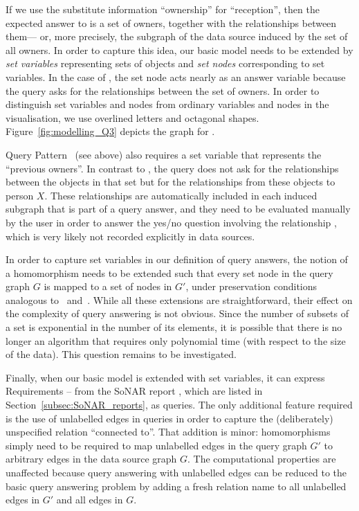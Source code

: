 If we use the substitute information \enquote{ownership} for \enquote{reception},
then the expected answer to  is a set of owners,
together with the relationships between them---%
or, more precisely, the subgraph of the data source induced by the set of all owners.
In order to capture this idea,
our basic model needs to be extended by \emph{set variables} representing sets of objects
and \emph{set nodes} corresponding to set variables.
In the case of , the set node acts nearly as an answer variable
because the query asks for the relationships between the set of owners.
In order to distinguish set variables and nodes from ordinary variables and nodes in the visualisation,
we use overlined letters and octagonal shapes.
Figure~\ref{fig:modelling_Q3} depicts the graph for .

Query Pattern~ (see above) also requires a set variable
that represents the \enquote{previous owners}. In contrast to ,
the query does not ask for the relationships between the objects in that set
but for the relationships from these objects to person $X$.
These relationships are automatically included in each induced subgraph that is part of a query answer,
and they need to be evaluated manually by the user
in order to answer the yes/no question involving the relationship ,
which is very likely not recorded explicitly in data sources.

In order to capture set variables in our definition of query answers,
the notion of a homomorphism needs to be extended such that
every set node in the query graph $G$ is mapped to a set of nodes in $G'$,
under preservation conditions analogous to~ and~.
While all these extensions are straightforward,
their effect on the complexity of query answering is not obvious.
Since the number of subsets of a set is exponential in the number of its
elements, it is possible that there is no longer an algorithm
that requires only polynomial time (with respect to the size of the data).
This question remains to be investigated.

Finally, when our basic model is extended with set variables,
it can express Requirements -- from the 
SoNAR report \autocite{Fangerau2022}, which are listed in Section~\ref{subsec:SoNAR_reports},
as queries.
The only additional feature required is the use of unlabelled edges in queries
in order to capture the (deliberately) unspecified relation \enquote{connected to}.
That addition is minor: homomorphisms simply need to be required to map unlabelled
edges in the query graph $G'$ to arbitrary edges in the data source graph $G$.
The computational properties are unaffected because 
query answering with unlabelled edges can be reduced to the basic query answering problem
by adding a fresh relation name to all unlabelled edges in $G'$ and all edges in $G$.

